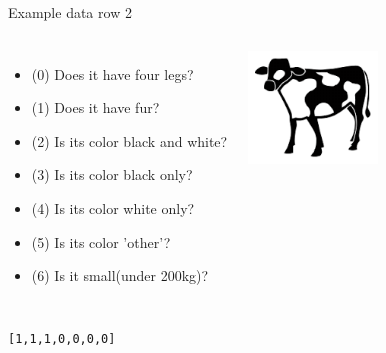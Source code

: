 \documentclass[15pt]{beamer}
\begin{document}
\begin{frame}{Example data row 2}
    \begin{columns}[b]
        \small
        \begin{itemize}\itemsep0.25em
            \item (0) Does it have four legs?
            \item (1) Does it have fur?
            \item (2) Is its color black and white?
            \item (3) Is its color black only?
            \item (4) Is its color white only?
            \item (5) Is its color 'other'?
            \item (6) Is it small(under 200kg)?
        \end{itemize}
        \includegraphics[height=30mm]{img/cow_2.png}
    \end{columns}

    \vspace{6mm}
    \normalsize
    \hspace{68mm}\texttt{[1,1,1,0,0,0,0]}
\end{frame}
\end{document}
